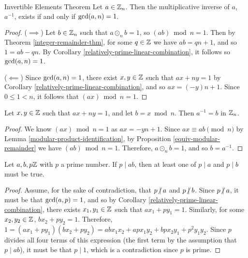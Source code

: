 \begin{thm} Invertible Elements Theorem \proofbreak
    Let $a \in \mathbb{Z}_n$. Then the multiplicative inverse of $a$, $a^{-1}$, exists if and only if $\operatorname{gcd}(a, n) = 1$.
\end{thm}

\begin{proof}\proofbreak
    ($\implies$) Let $b \in \mathbb{Z}_n$ such that $a \odot_n b = 1$, so $(ab) \bmod n = 1$. Then by Theorem \ref{integer-remainder-thm}, for some $q \in \mathbb{Z}$ we have $ab = qn + 1$, and so $1 = ab - qn$. By Corollary \ref{relatively-prime-linear-combination}, it follows so $\operatorname{gcd}(a, n) = 1$.

    ($\impliedby$) Since $\operatorname{gcd}(a, n) = 1$, there exist $x, y \in \mathbb{Z}$ such that $ax + ny = 1$ by Corollary \ref{relatively-prime-linear-combination}, and so $ax = (-y)n + 1$. Since $0 \leq 1 < n$, it follows that $(ax) \bmod n = 1$.
\end{proof}

\begin{cor}
    Let $x, y \in \mathbb{Z}$ such that $ax + ny = 1$, and let $b = x \bmod n$. Then $a^{-1} = b$ in $\mathbb{Z}_n$.
\end{cor}

\begin{proof}
    We know $(ax) \bmod n = 1$ as $ax = -yn + 1$. Since $ax \equiv ab \pmod n$ by Lemma \ref{modular-product-identification}, by Proposition \ref{equiv-modular-remainder} we have $(ab) \bmod n = 1$. Therefore, $a \odot_n b = 1$, and so $b = a^{-1}$.
\end{proof}

\begin{lemma}\label{prime-division-one}
    Let $a, b, p \mathbb{Z}$ with $p$ a prime number. If $p \mid ab$, then at least one of $p \mid a$ and $p \mid b$ must be true.
\end{lemma}

\begin{proof}
    Assume, for the sake of contradiction, that $p \centernot\mid a$ and $p \centernot\mid b$. Since $p \centernot\mid a$, it must be that $\operatorname{gcd}(a, p) = 1$, and so by Corollary \ref{relatively-prime-linear-combination}, there exists $x_1, y_1 \in \mathbb{Z}$ such that $ax_1 + py_1 = 1$. Similarly, for some $x_2, y_2 \in \mathbb{Z}$, $bx_2 + py_2 = 1$. Therefore, $1 = (ax_1 + py_1)(bx_2 + py_2) = abx_1x_2 + apx_1y_2 + bpx_2y_1 + p^2y_1y_2$. Since $p$ divides all four terms of this expression (the first term by the assumption that $p \mid ab$), it must be that $p \mid 1$, which is a contradiction since $p$ is prime.
\end{proof}

